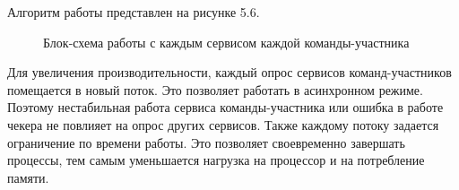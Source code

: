 Алгоритм работы представлен на рисунке 5.6.
\begin{figure}[ht!]
\caption{Блок-схема работы с каждым сервисом каждой команды-участника}
\end{figure}


Для увеличения производительности, каждый опрос сервисов команд-участников помещается в новый поток. Это позволяет работать в асинхронном режиме. Поэтому нестабильная работа сервиса команды-участника или ошибка в работе чекера не повлияет на опрос других сервисов. Также каждому потоку задается ограничение по времени работы. Это позволяет своевременно завершать процессы, тем самым уменьшается нагрузка на процессор и на потребление памяти.

